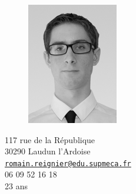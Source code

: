 \documentclass[a4paper,11pt,final]{memoir}
\begin{document}
\begin{figure}
	\hfill
	\includegraphics[width=0.5\columnwidth]{../IMG_7936-Modifier_cv}
	\vspace{-0.5cm}
\end{figure}

\begin{flushright}\small
	117 rue de la République\\
	30290 Laudun l'Ardoise\\
	{\footnotesize\href{mailto:romain.reignier@edu.supmeca.fr}{\nolinkurl{romain.reignier@edu.supmeca.fr}}}\\
	06 09 52 16 18\\
	23 ans
\end{flushright}%
\end{document}
